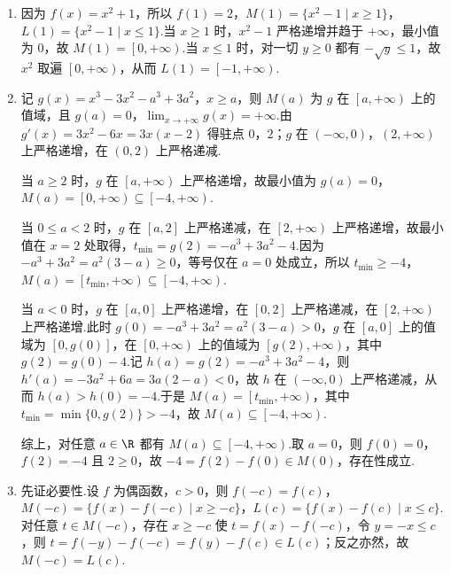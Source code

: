 \begin{solution}
\begin{enumerate}
\item 因为 \(f(x)=x^2+1\)，所以 \(f(1)=2\)，\(M(1)=\{x^2-1\mid x\ge 1\}\)，\(L(1)=\{x^2-1\mid x\le 1\}\).当 \(x\ge 1\) 时，\(x^2-1\) 严格递增并趋于 \(+\infty\)，最小值为 \(0\)，故 \(M(1)=\left[0,+\infty\right)\).当 \(x\le 1\) 时，对一切 \(y\ge 0\) 都有 \(-\sqrt{y}\le 1\)，故 \(x^2\) 取遍 \(\left[0,+\infty\right)\)，从而 \(L(1)=\left[-1,+\infty\right)\).

\item 记 \(g(x)=x^3-3x^2-a^3+3a^2\)，\(x\ge a\)，则 \(M(a)\) 为 \(g\) 在 \(\left[a,+\infty\right)\) 上的值域，且 \(g(a)=0\)，\(\displaystyle\lim_{x\to +\infty}g(x)=+\infty\).由 \(g'(x)=3x^2-6x=3x\left(x-2\right)\) 得驻点 \(0\)，\(2\)；\(g\) 在 \(\left(-\infty,0\right)\)，\(\left(2,+\infty\right)\) 上严格递增，在 \(\left(0,2\right)\) 上严格递减.

当 \(a\ge 2\) 时，\(g\) 在 \(\left[a,+\infty\right)\) 上严格递增，故最小值为 \(g(a)=0\)，\(M(a)=\left[0,+\infty\right)\subseteq\left[-4,+\infty\right)\).

当 \(0\le a<2\) 时，\(g\) 在 \(\left[a,2\right]\) 上严格递减，在 \(\left[2,+\infty\right)\) 上严格递增，故最小值在 \(x=2\) 处取得，\(t_{\min}=g(2)=-a^3+3a^2-4\).因为 \(-a^3+3a^2=a^2\left(3-a\right)\ge 0\)，等号仅在 \(a=0\) 处成立，所以 \(t_{\min}\ge -4\)，\(M(a)=\left[t_{\min},+\infty\right)\subseteq\left[-4,+\infty\right)\).

当 \(a<0\) 时，\(g\) 在 \(\left[a,0\right]\) 上严格递增，在 \(\left[0,2\right]\) 上严格递减，在 \(\left[2,+\infty\right)\) 上严格递增.此时 \(g(0)=-a^3+3a^2=a^2\left(3-a\right)>0\)，\(g\) 在 \(\left[a,0\right]\) 上的值域为 \(\left[0,g(0)\right]\)，在 \(\left[0,+\infty\right)\) 上的值域为 \(\left[g(2),+\infty\right)\)，其中 \(g(2)=g(0)-4\).记 \(h(a)=g(2)=-a^3+3a^2-4\)，则 \(h'(a)=-3a^2+6a=3a\left(2-a\right)<0\)，故 \(h\) 在 \(\left(-\infty,0\right)\) 上严格递减，从而 \(h(a)>h(0)=-4\).于是 \(M(a)=\left[t_{\min},+\infty\right)\)，其中 \(t_{\min}=\min\{0,g(2)\}>-4\)，故 \(M(a)\subseteq\left[-4,+\infty\right)\).

综上，对任意 \(a\in\R\) 都有 \(M(a)\subseteq\left[-4,+\infty\right)\).取 \(a=0\)，则 \(f(0)=0\)，\(f(2)=-4\) 且 \(2\ge 0\)，故 \(-4=f(2)-f(0)\in M(0)\)，存在性成立.

\item 先证必要性.设 \(f\) 为偶函数，\(c>0\)，则 \(f(-c)=f(c)\)，\(M(-c)=\{f(x)-f(-c)\mid x\ge -c\}\)，\(L(c)=\{f(x)-f(c)\mid x\le c\}\).对任意 \(t\in M(-c)\)，存在 \(x\ge -c\) 使 \(t=f(x)-f(-c)\)，令 \(y=-x\le c\)，则 \(t=f(-y)-f(-c)=f(y)-f(c)\in L(c)\)；反之亦然，故 \(M(-c)=L(c)\).


\end{enumerate}
\end{solution}
